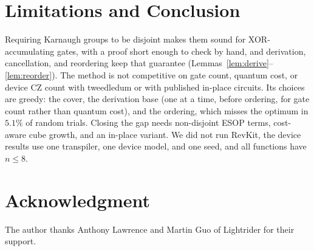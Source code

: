 \documentclass[conference]{IEEEtran}
\theoremstyle{plain}
\begin{document}
\section{Limitations and Conclusion}
Requiring Karnaugh groups to be disjoint makes them sound for
XOR-accumulating gates, with a proof short enough to check by hand, and
derivation, cancellation, and reordering keep that guarantee
(Lemmas~\ref{lem:derive}--\ref{lem:reorder}). The method is not
competitive on gate count, quantum cost, or device CZ count with
tweedledum or with published in-place circuits. Its choices are greedy:
the cover, the derivation base (one at a time, before ordering, for gate
count rather than quantum cost), and the ordering, which misses the
optimum in $5.1\%$ of random trials. Closing the gap needs non-disjoint
ESOP terms, cost-aware cube growth, and an in-place variant. We did not
run RevKit, the device results use one transpiler, one device model, and
one seed, and all functions have $n\le8$.

\section*{Acknowledgment}
The author thanks Anthony Lawrence and Martin Guo of Lightrider for their support.
\end{document}
